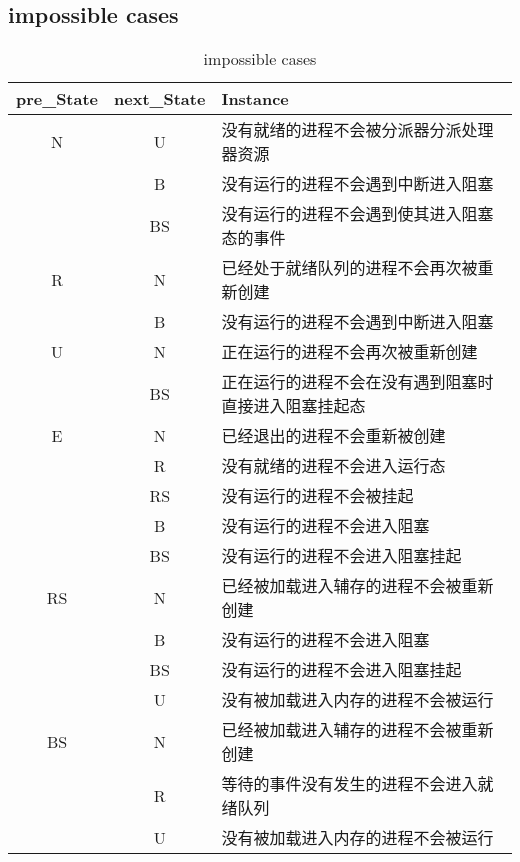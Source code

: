 \documentclass[UTF8]{ctexart}
\begin{document}
    \subsection*{impossible cases}
    \begin{table}[h]
    \centering
    \large
    \caption{impossible cases}
    \begin{tabular}{ccp{10cm}}
        \hline 
        pre\_State & next\_State & Instance\\
        \hline
        N & U & 没有就绪的进程不会被分派器分派处理器资源\\
         & B & 没有运行的进程不会遇到中断进入阻塞\\
         
         & BS & 没有运行的进程不会遇到使其进入阻塞态的事件\\
        \hline
        R & N & 已经处于就绪队列的进程不会再次被重新创建\\
        & B & 没有运行的进程不会遇到中断进入阻塞\\
        
        \hline
        U & N & 正在运行的进程不会再次被重新创建\\
         & BS & 正在运行的进程不会在没有遇到阻塞时直接进入阻塞挂起态\\
        \hline
        E & N & 已经退出的进程不会重新被创建\\
        & R & 没有就绪的进程不会进入运行态\\
        & RS & 没有运行的进程不会被挂起\\
        & B & 没有运行的进程不会进入阻塞\\
        & BS & 没有运行的进程不会进入阻塞挂起\\
        \hline
        RS & N & 已经被加载进入辅存的进程不会被重新创建\\
        & B & 没有运行的进程不会进入阻塞\\
        & BS & 没有运行的进程不会进入阻塞挂起\\
        & U & 没有被加载进入内存的进程不会被运行\\
        
        \hline
        BS & N & 已经被加载进入辅存的进程不会被重新创建\\
        & R & 等待的事件没有发生的进程不会进入就绪队列\\
        & U & 没有被加载进入内存的进程不会被运行\\
        
        \hline

    \end{tabular}
    \end{table}
\end{document}
